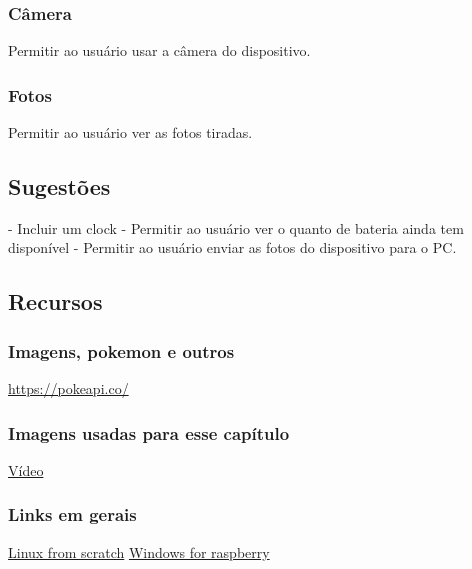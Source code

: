 \documentclass[../main.tex]{subfiles}
\begin{document}
\subsubsection{Câmera}
Permitir ao usuário usar a câmera do dispositivo. \newline

\subsubsection{Fotos}
Permitir ao usuário ver as fotos tiradas. \newline

\subsection{Sugestões}
- Incluir um clock \newline
- Permitir ao usuário ver o quanto de bateria ainda tem disponível \newline
- Permitir ao usuário enviar as fotos do dispositivo para o PC. \newline

\subsection{Recursos}

\subsubsection{Imagens, pokemon e outros}
\url{https://pokeapi.co/}

\subsubsection{Imagens usadas para esse capítulo}
\href{https://www.youtube.com/watch?v=g2Jbhj6MhMk}{Vídeo}

\subsubsection{Links em gerais}
\href{https://www.linuxfromscratch.org/}{Linux from scratch}
\href{https://worproject.ml/}{Windows for raspberry}
\end{document}
